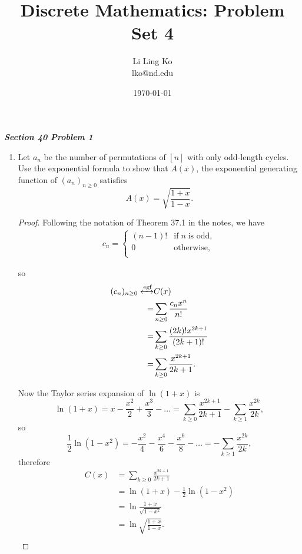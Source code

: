 \documentclass{article}
\begin{document}
\title{Discrete Mathematics: Problem Set 4}
\author{Li Ling Ko\\ lko@nd.edu}
\date{\today}
\maketitle

\it \textbf{Section 40 Problem 1}
  \begin{enumerate}[label={(\alph*)}]
    \item \label{qn:odd}
      Let $a_n$ be the number of permutations of $[n]$ with only
      odd-length cycles. Use the exponential formula to show that $A(x)$,
      the exponential generating function of $(a_n)_{n\geq0}$ satisfies
      \[A(x) = \sqrt{\frac{1+x}{1-x}}.\]

      \begin{proof}
        Following the notation of Theorem 37.1 in the notes, we have
        \begin{align*}
          c_n =
          \begin{cases}
            (n-1)! &\text{if}\; n\; \text{is odd},\\
            0 &\text{otherwise},\\
          \end{cases}
        \end{align*}

        so
        \begin{align*}
          (c_n)_{n\geq0}\xleftrightarrow{\text{egf}} &C(x)\\
          =&\sum_{n\geq0} \frac{c_nx^n}{n!}\\
          =&\sum_{k\geq0} \frac{(2k)!x^{2k+1}}{(2k+1)!}\\
          =&\sum_{k\geq0} \frac{x^{2k+1}}{2k+1}.\\
        \end{align*}

        Now the Taylor series expansion of $\ln{(1+x)}$ is
        \[\ln{(1+x)} =x -\frac{x^2}{2} +\frac{x^3}{3} -\ldots
        =\sum_{k\geq0} \frac{x^{2k+1}}{2k+1} -\sum_{k\geq1}
        \frac{x^{2k}}{2k},\]
        so
        \[\frac{1}{2}\ln{(1-x^2)} =-\frac{x^2}{4} -\frac{x^4}{6}
        -\frac{x^6}{8} -\ldots =-\sum_{k\geq1} \frac{x^{2k}}{2k},\]
        therefore
        \begin{align*}
          C(x) &=\sum_{k\geq0} \frac{x^{2k+1}}{2k+1}\\
          &=\ln{(1+x)} -\frac{1}{2}\ln{(1-x^2)}\\
          &=\ln{\frac{1+x}{\sqrt{1-x^2}}}\\
          &=\ln{\sqrt{\frac{1+x}{1-x}}}.\\
        \end{align*}


\end{proof}
\end{enumerate}
\end{document}
